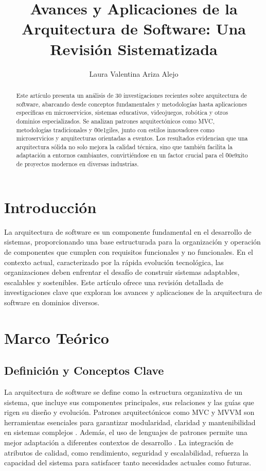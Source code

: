 \documentclass[conference]{IEEEtran}
\begin{document}
\title{Avances y Aplicaciones de la Arquitectura de Software: Una Revisi\'on Sistematizada}

\author{Laura Valentina Ariza Alejo}

\maketitle

\begin{abstract}
Este art\'iculo presenta un an\'alisis de 30 investigaciones recientes sobre arquitectura de software, abarcando desde conceptos fundamentales y metodolog\'ias hasta aplicaciones espec\'ificas en microservicios, sistemas educativos, videojuegos, rob\'otica y otros dominios especializados. Se analizan patrones arquitect\'onicos como MVC, metodolog\'ias tradicionales y \u00e1giles, junto con estilos innovadores como microservicios y arquitecturas orientadas a eventos. Los resultados evidencian que una arquitectura s\'olida no solo mejora la calidad t\'ecnica, sino que tambi\'en facilita la adaptaci\'on a entornos cambiantes, convirti\'endose en un factor crucial para el \u00e9xito de proyectos modernos en diversas industrias.
\end{abstract}

\section{Introducci\'on}
La arquitectura de software es un componente fundamental en el desarrollo de sistemas, proporcionando una base estructurada para la organizaci\'on y operaci\'on de componentes que cumplen con requisitos funcionales y no funcionales. En el contexto actual, caracterizado por la r\'apida evoluci\'on tecnol\'ogica, las organizaciones deben enfrentar el desaf\'io de construir sistemas adaptables, escalables y sostenibles. Este art\'iculo ofrece una revisi\'on detallada de investigaciones clave que exploran los avances y aplicaciones de la arquitectura de software en dominios diversos.

\section{Marco Te\'orico}
\subsection{Definici\'on y Conceptos Clave}
La arquitectura de software se define como la estructura organizativa de un sistema, que incluye sus componentes principales, sus relaciones y las gu\'ias que rigen su dise\~no y evoluci\'on. Patrones arquitect\'onicos como MVC y MVVM son herramientas esenciales para garantizar modularidad, claridad y mantenibilidad en sistemas complejos \cite{gamma1994design}. Adem\'as, el uso de lenguajes de patrones permite una mejor adaptaci\'on a diferentes contextos de desarrollo \cite{fairbanks2010just}. La integraci\'on de atributos de calidad, como rendimiento, seguridad y escalabilidad, refuerza la capacidad del sistema para satisfacer tanto necesidades actuales como futuras.
\end{document}
